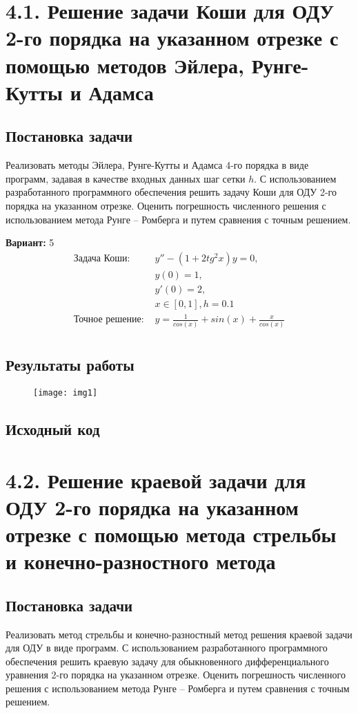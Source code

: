 \section* {4.1. Решение задачи Коши для ОДУ 2-го порядка на указанном отрезке с помощью методов Эйлера, Рунге-Кутты и Адамса}


\subsection{Постановка задачи}
Реализовать методы Эйлера, Рунге-Кутты и Адамса 4-го порядка в виде программ, задавая в качестве входных данных шаг сетки $h$. С использованием разработанного программного обеспечения решить задачу Коши для ОДУ 2-го порядка на указанном отрезке. Оценить погрешность численного решения с использованием метода Рунге – Ромберга и путем сравнения с точным решением. 

{\bfseries Вариант:} 5
\begin{align*}
\text{Задача Коши: }
& y'' - (1 + 2tg^2x)y = 0, \\
& y(0) = 1,\\
& y'(0) = 2,\\
& x \in [0, 1], h =0.1 \\
\text{Точное решение: }
& y = \frac{1}{cos(x)} + sin(x) + \frac{x}{cos(x)} \\
\end{align*}
\pagebreak

\subsection{Результаты работы}
\begin{figure}[h!]
\centering
\texttt{[image: img1]}
\end{figure}

\subsection{Исходный код}

\pagebreak

\section* {4.2. Решение краевой задачи для ОДУ 2-го порядка на указанном отрезке с помощью метода стрельбы и конечно-разностного метода}

\setcounter{subsection}{0}


\subsection{Постановка задачи}
Реализовать метод стрельбы и конечно-разностный метод решения краевой задачи для ОДУ в виде программ. С использованием разработанного программного обеспечения решить краевую задачу для обыкновенного дифференциального уравнения 2-го порядка на указанном отрезке. Оценить погрешность численного решения с использованием метода Рунге – Ромберга и путем сравнения с точным решением.  

